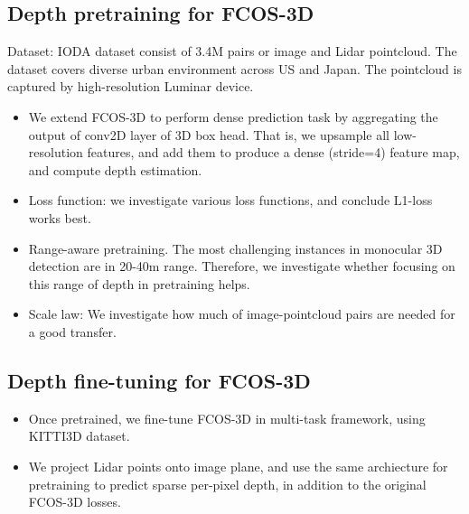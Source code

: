 \subsection{Depth pretraining for FCOS-3D}
Dataset: IODA dataset consist of 3.4M pairs or image and Lidar pointcloud. The dataset covers diverse urban environment across US and Japan. The pointcloud is captured by high-resolution Luminar device.
\begin{itemize}
    \item We extend FCOS-3D to perform dense prediction task by aggregating the output of conv2D layer of 3D box head. That is, we upsample all low-resolution features, and add them to produce a dense (stride=4) feature map, and compute depth estimation.
    \item Loss function: we investigate various loss functions, and conclude L1-loss works best.
    \item Range-aware pretraining. The most challenging instances in monocular 3D detection are in 20-40m range. Therefore, we investigate whether focusing on this range of depth in pretraining helps.
    \item Scale law: We investigate how much of image-pointcloud pairs are needed for a good transfer.
\end{itemize}
\subsection{Depth fine-tuning for FCOS-3D}
\begin{itemize}
    \item Once pretrained, we fine-tune FCOS-3D in multi-task framework, using KITTI3D dataset.
    \item We project Lidar points onto image plane, and use the same archiecture for pretraining to predict sparse per-pixel depth, in addition to the original FCOS-3D losses.
\end{itemize}
